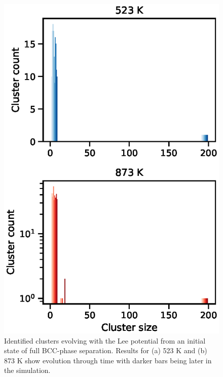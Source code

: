 \begin{figure}[h]
    \centering
    \includegraphics[width=\textwidth]{figures/decomposing_clusters}
    \caption{Identified \DOTHREE clusters evolving with the Lee potential from an initial state of full BCC-\DOTHREE phase separation. Results for (a) 523 K and (b) 873 K show evolution through time with darker bars being later in the simulation.}
    \label{fig:lee_dissolution}
\end{figure}

